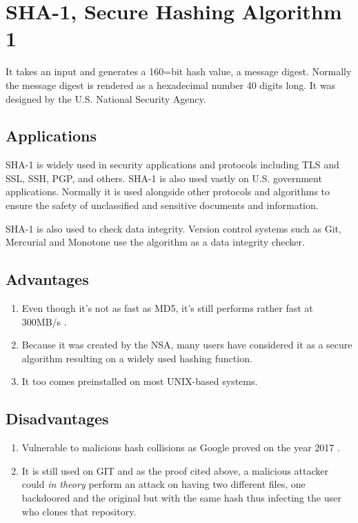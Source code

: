 \documentclass[]{article}
\begin{document}
\section{SHA-1, Secure Hashing Algorithm 1}
It takes an input and generates a 160=bit hash value, a message digest. Normally the message digest is rendered as a hexadecimal number 40 digits long. It was designed by the U.S. National Security Agency. 

\subsection{Applications}
SHA-1 is widely used in security applications and protocols including TLS and SSL, SSH, PGP, and others. SHA-1 is also used vastly on U.S. government applications. Normally it is used alongside other protocols and algorithms to ensure the safety of unclassified and sensitive documents and information. 

\par SHA-1 is also used to check data integrity. Version control systems such as Git, Mercurial and Monotone use the algorithm as a data integrity checker. 

\subsection{Advantages}
\begin{enumerate}
	\item Even though it's not as fast as MD5, it's still performs rather fast at 300MB/s \cite{HashMD5Considered}.
	\item Because it was created by the NSA, many users have considered it as a secure algorithm resulting on a widely used hashing function. 
	\item It too comes preinstalled on most UNIX-based systems.
\end{enumerate}

\subsection{Disadvantages}
\begin{enumerate}
	\item Vulnerable to malicious hash collisions as Google proved on the year 2017 \cite{stevensFirstCollisionFull2017}.
	\item It is still used on GIT and as the proof cited above, a malicious attacker could \textit{in theory} perform an attack on having two different files, one backdoored and the original but with the same hash thus infecting the user who clones that repository. 
\end{enumerate}
\end{document}
